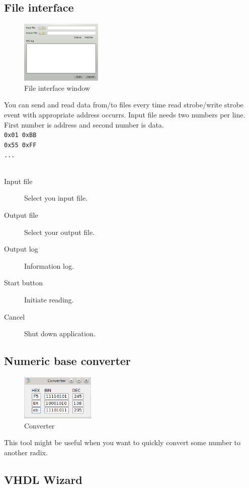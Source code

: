     \subsection{File interface}
        \begin{figure}
            \centering
            \includegraphics[width=110pt]{img/file_interface.png}
            \caption{File interface window}
        \end{figure}
        You can send and read data from/to files every time read strobe/write strobe event with appropriate address occurrs. Input file needs two numbers per line. First number is address and second number is
        data. 
        ~\\
        \verb'0x01 0xBB'\\
        \verb'0x55 0xFF'\\
        \verb'...'\\
        \\        
        \begin{description}
            \item[Input file] Select you input file.
            \item[Output file] Select your output file.
            \item[Output log] Information log.
            \item[Start button] Initiate reading.
            \item[Cancel] Shut down application.
        \end{description}

    \subsection{Numeric base converter}
        \begin{figure}
            \centering
            \includegraphics[width=100pt]{img/converter.png}
            \caption{Converter}
        \end{figure}
        This tool might be useful when you want to quickly convert some number to another radix.

    \clearpage
    \subsection{VHDL Wizard}
        
